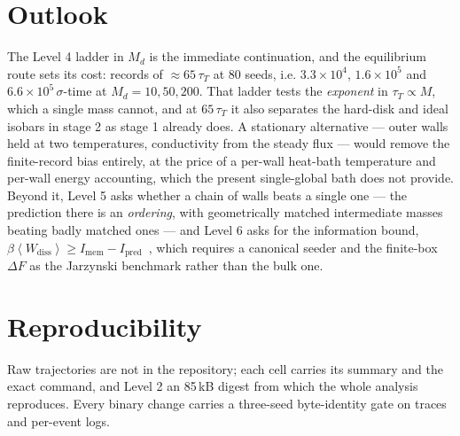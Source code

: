 \documentclass[journal]{IEEEtran}
\newcommand{\avg}[1]{\left\langle #1 \right\rangle}
\begin{document}
\section{Outlook}
The Level 4 ladder in $M_d$ is the immediate continuation, and the equilibrium route sets its cost:
records of $\approx 65\,\tau_T$ at 80 seeds, i.e. $3.3\times10^4$, $1.6\times10^5$ and
$6.6\times10^5\,\sigma$-time at $M_d = 10, 50, 200$. That ladder tests the \emph{exponent} in
$\tau_T \propto M$, which a single mass cannot, and at $65\,\tau_T$ it also separates the hard-disk
and ideal isobars in stage 2 as stage 1 already does. A stationary alternative --- outer walls held
at two temperatures, conductivity from the steady flux --- would remove the finite-record bias
entirely, at the price of a per-wall heat-bath temperature and per-wall energy accounting, which the
present single-global bath does not provide. Beyond it, Level 5 asks whether a chain of walls beats a single one --- the prediction
there is an \emph{ordering}, with geometrically matched intermediate masses beating badly matched
ones --- and Level 6 asks for the information bound,
$\beta\avg{W_{\mathrm{diss}}} \ge I_{\mathrm{mem}} - I_{\mathrm{pred}}$~\cite{still2012}, which
requires a canonical seeder and the finite-box $\Delta F$ as the Jarzynski benchmark rather than the
bulk one.

\section*{Reproducibility}
Raw trajectories are not in the repository; each cell carries its summary and the exact command,
and Level 2 an 85\,kB digest from which the whole analysis reproduces. Every binary change carries a
three-seed byte-identity gate on traces and per-event logs.
\end{document}
